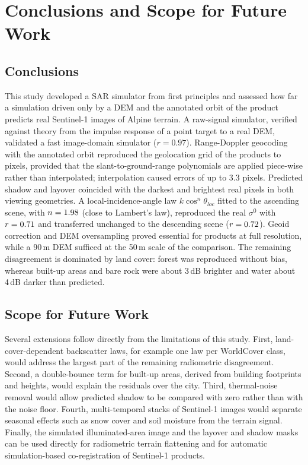 \chapter{Conclusions and Scope for Future Work}
\label{ch:conclusions}

\section{Conclusions}
This study developed a SAR simulator from first principles and assessed how far a simulation driven only by a DEM and
the annotated orbit of the product predicts real Sentinel-1 images of Alpine terrain. A raw-signal simulator, verified
against theory from the impulse response of a point target to a real DEM, validated a fast image-domain simulator
($r=0.97$). Range-Doppler geocoding with the annotated orbit reproduced the geolocation grid of the products to
\geoDpixMax{} pixels, provided that the slant-to-ground-range polynomials are applied piece-wise rather than
interpolated; interpolation caused errors of up to 3.3 pixels. Predicted shadow and layover coincided with the darkest
and brightest real pixels in both viewing geometries. A local-incidence-angle law $k\cos^{n}\theta_{loc}$ fitted to
the ascending scene, with $n=1.98$ (close to Lambert's law), reproduced the real $\sigma^0$ with $r=0.71$ and
transferred unchanged to the descending scene ($r=0.72$). Geoid correction and DEM oversampling proved essential for
products at full resolution, while a 90\,m DEM sufficed at the 50\,m scale of the comparison. The remaining
disagreement is dominated by land cover: forest was reproduced without bias, whereas built-up areas and bare rock were
about 3\,dB brighter and water about 4\,dB darker than predicted.

\section{Scope for Future Work}
Several extensions follow directly from the limitations of this study. First, land-cover-dependent backscatter laws,
for example one law per WorldCover class, would address the largest part of the remaining radiometric disagreement.
Second, a double-bounce term for built-up areas, derived from building footprints and heights, would explain the
residuals over the city. Third, thermal-noise removal would allow predicted shadow to be compared with zero rather than
with the noise floor. Fourth, multi-temporal stacks of Sentinel-1 images would separate seasonal effects such as snow
cover and soil moisture from the terrain signal. Finally, the simulated illuminated-area image and the layover and
shadow masks can be used directly for radiometric terrain flattening and for automatic simulation-based
co-registration of Sentinel-1 products.
